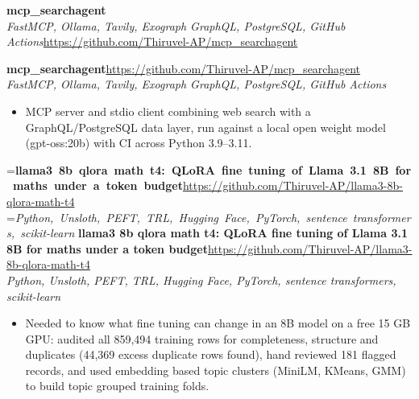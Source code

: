 \documentclass[a4paper,11pt]{article}
\newcommand{\project}[3]{%
  \textbf{#1}\hfill#3\\ {\color{muted}\small\textit{#2}}\par}
\newcommand{\gap}{\vspace{5pt}}
\begin{document}
\else
\textbf{mcp\_searchagent}\\ {\color{muted}\small\textit{FastMCP, Ollama, Tavily, Exograph GraphQL, PostgreSQL, GitHub Actions}}\hfill{\small\url{https://github.com/Thiruvel-AP/mcp_searchagent}}\par
\fi
\else
\project{mcp\_searchagent}{FastMCP, Ollama, Tavily, Exograph GraphQL, PostgreSQL, GitHub Actions}{\url{https://github.com/Thiruvel-AP/mcp_searchagent}}
\fi
\begin{itemize}
  \item MCP server and stdio client combining web search with a GraphQL/PostgreSQL data layer, run against a local open weight model (gpt-oss:20b) with CI across Python 3.9–3.11.
\end{itemize}
\gap
{}
=\hbox{\textbf{llama3 8b qlora math t4: QLoRA fine tuning of Llama 3.1 8B for maths under a token budget}\hspace{1em}\url{https://github.com/Thiruvel-AP/llama3-8b-qlora-math-t4}}%
=\hbox{{\small\textit{Python, Unsloth, PEFT, TRL, Hugging Face, PyTorch, sentence transformers, scikit-learn}}}%
\ifdim\wd0>\linewidth
\ifdim\wd2>\linewidth
\textbf{llama3 8b qlora math t4: QLoRA fine tuning of Llama 3.1 8B for maths under a token budget}\\ {\color{muted}\small\textit{Python, Unsloth, PEFT, TRL, Hugging Face, PyTorch, sentence transformers, scikit-learn}}\\ \hfill{\small\url{https://github.com/Thiruvel-AP/llama3-8b-qlora-math-t4}}\par
\else
\textbf{llama3 8b qlora math t4: QLoRA fine tuning of Llama 3.1 8B for maths under a token budget}\\ {\color{muted}\small\textit{Python, Unsloth, PEFT, TRL, Hugging Face, PyTorch, sentence transformers, scikit-learn}}\hfill{\small\url{https://github.com/Thiruvel-AP/llama3-8b-qlora-math-t4}}\par
\fi
\else
\project{llama3 8b qlora math t4: QLoRA fine tuning of Llama 3.1 8B for maths under a token budget}{Python, Unsloth, PEFT, TRL, Hugging Face, PyTorch, sentence transformers, scikit-learn}{\url{https://github.com/Thiruvel-AP/llama3-8b-qlora-math-t4}}
\fi
\begin{itemize}
  \item Needed to know what fine tuning can change in an 8B model on a free 15 GB GPU: audited all 859,494 training rows for completeness, structure and duplicates (44,369 excess duplicate rows found), hand reviewed 181 flagged records, and used embedding based topic clusters (MiniLM, KMeans, GMM) to build topic grouped training folds.
\end{itemize}
\end{document}
